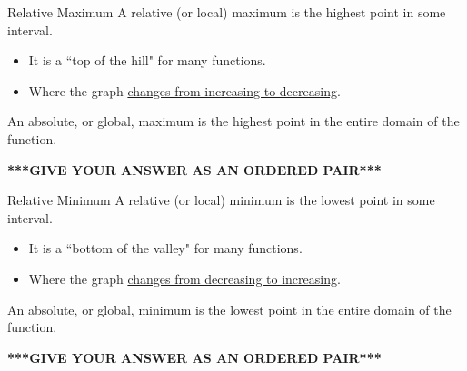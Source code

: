 \documentclass[t,usenames,dvipsnames]{beamer}
\begin{document}
\begin{frame}{Relative Maximum}
A \alert{relative (or local) maximum} is the highest point in some interval. \newline\\  \pause
\begin{itemize}
    \item It is a ``top of the hill" for many functions.  \newline\\  \pause
    \item Where the graph \underline{changes from increasing to decreasing}.  \newline\\  \pause
\end{itemize}

An absolute, or global, maximum is the highest point in the entire domain of the function.  \newline\\  \pause

\textbf{{\color{red}***GIVE YOUR ANSWER AS AN ORDERED PAIR***}}
\end{frame}


\begin{frame}{Relative Minimum}
A \alert{relative (or local) minimum} is the lowest point in some interval. \newline\\  \pause
\begin{itemize}
    \item It is a ``bottom of the valley" for many functions.  \newline\\  \pause
    \item Where the graph \underline{changes from decreasing to increasing}.  \newline\\  \pause
\end{itemize}

An absolute, or global, minimum is the lowest point in the entire domain of the function.  \newline\\  \pause

\textbf{{\color{red}***GIVE YOUR ANSWER AS AN ORDERED PAIR***}}
\end{frame}
\end{document}
